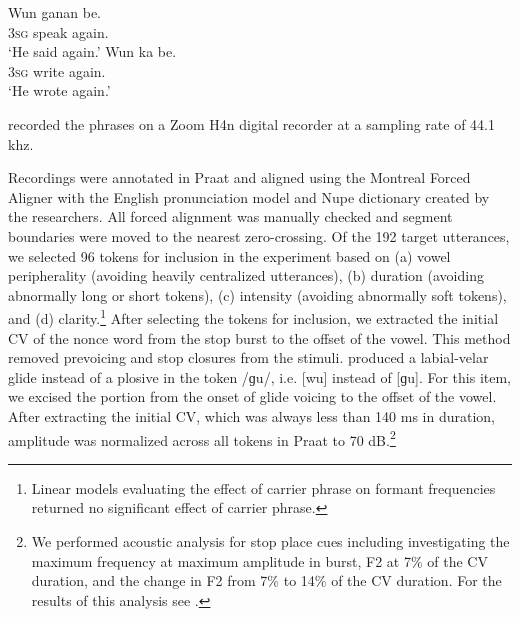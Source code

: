 \documentclass[output=paper,colorlinks,citecolor=brown
]{langscibook}
\begin{document}
\ea\label{ex:burnsshaw:elicitation}
\begin{xlist}
\ex \gll Wun	ganan	\underline{\hspace{0.5cm}}	be.\\
3\textsc{sg}	speak	\underline{\hspace{0.5cm}}	again.\\
\glt ‘He said \underline{\hspace{0.5cm}} again.’
\ex
\gll Wun	ka	\underline{\hspace{0.5cm}}	be.\\
3\textsc{sg}	write	\underline{\hspace{0.5cm}}	again.\\
\glt ‘He wrote \underline{\hspace{0.5cm}} again.’
\end{xlist}
\z

\noindent \citeauthor{Kawu} recorded the phrases on a Zoom H4n digital recorder at a sampling rate of 44.1 khz.

Recordings were annotated in Praat \citep{BoersmaWeenink2019} and aligned using the Montreal Forced Aligner \citep{Mcauliffe2017} with the English pronunciation model and Nupe dictionary created by the researchers. All forced alignment was manually checked and segment boundaries were moved to the nearest zero-crossing. Of the 192 target utterances, we selected 96 tokens for inclusion in the experiment based on (a) vowel peripherality (avoiding heavily centralized utterances), (b) duration (avoiding abnormally long or short tokens), (c) intensity (avoiding abnormally soft tokens), and (d) clarity.\footnote{Linear models evaluating the effect of carrier phrase on formant frequencies returned no significant effect of carrier phrase.} After selecting the tokens for inclusion, we extracted the initial CV of the nonce word from the stop burst to the offset of the vowel. This method removed prevoicing and stop closures from  the stimuli. \citeauthor{Kawu} produced a labial-velar glide instead of a plosive in the token /ɡu/, i.e. [wu] instead of [ɡu]. For this item, we excised the portion from the onset of glide voicing to the offset of the vowel. After extracting the initial CV, which was always less than 140 ms in duration, amplitude was normalized across all tokens in Praat to 70 dB.\footnote{We performed acoustic analysis for stop place cues including investigating the maximum frequency at maximum amplitude in burst, F2 at 7\% of the CV duration, and the change in F2 from 7\% to 14\% of the CV duration. For the results of this analysis see \citet{BurnsShaw2023}.}
 
\end{document}
